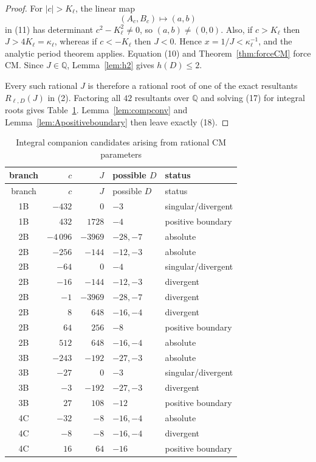 \documentclass[11pt,a4paper]{amsart} %
\theoremstyle{definition}
\newcommand{\Q}{\mathbb Q}
\begin{document}
\begin{proof}
For \(|c|>K_\ell\), the linear map
\[
(A_c,B_c)\longmapsto(a,b)
\]
in (11) has determinant \(c^2-K_\ell^2\ne0\), so \((a,b)\ne(0,0)\).
Also, if \(c>K_\ell\) then \(J>4K_\ell=\kappa_\ell\), whereas if
\(c<-K_\ell\) then \(J<0\). Hence \(x=1/J<\kappa_\ell^{-1}\), and the
analytic period theorem applies. Equation (10) and
Theorem~\ref{thm:forceCM} force CM. Since \(J\in\Q\), Lemma~\ref{lem:h2}
gives \(h(D)\le2\).

Every such rational \(J\) is therefore a rational root of one of the exact
resultants \(R_{\ell,D}(J)\) in (2). Factoring all \(42\) resultants over
\(\Q\) and solving (17) for integral roots gives
Table~\ref{tab:compCMcand}. Lemma~\ref{lem:compconv} and
Lemma~\ref{lem:Apositiveboundary} then leave exactly (18).
\end{proof}

\begin{longtable}{@{}c r r l l@{}}
\caption{Integral companion candidates arising from rational CM parameters}
\label{tab:compCMcand}\\
\toprule
branch&\(c\)&\(J\)&possible \(D\)&status\\
\midrule
\endfirsthead
\toprule
branch&\(c\)&\(J\)&possible \(D\)&status\\
\midrule
\endhead
1B & \(-432\) & \(0\) & \(-3\) & singular/divergent \\
1B & \(432\) & \(1728\) & \(-4\) & positive boundary \\
2B & \(-4\,096\) & \(-3969\) & \(-28, -7\) & absolute \\
2B & \(-256\) & \(-144\) & \(-12, -3\) & absolute \\
2B & \(-64\) & \(0\) & \(-4\) & singular/divergent \\
2B & \(-16\) & \(-144\) & \(-12, -3\) & divergent \\
2B & \(-1\) & \(-3969\) & \(-28, -7\) & divergent \\
2B & \(8\) & \(648\) & \(-16, -4\) & divergent \\
2B & \(64\) & \(256\) & \(-8\) & positive boundary \\
2B & \(512\) & \(648\) & \(-16, -4\) & absolute \\
3B & \(-243\) & \(-192\) & \(-27, -3\) & absolute \\
3B & \(-27\) & \(0\) & \(-3\) & singular/divergent \\
3B & \(-3\) & \(-192\) & \(-27, -3\) & divergent \\
3B & \(27\) & \(108\) & \(-12\) & positive boundary \\
4C & \(-32\) & \(-8\) & \(-16, -4\) & absolute \\
4C & \(-8\) & \(-8\) & \(-16, -4\) & divergent \\
4C & \(16\) & \(64\) & \(-16\) & positive boundary \\
\bottomrule
\end{longtable}
\end{document}

